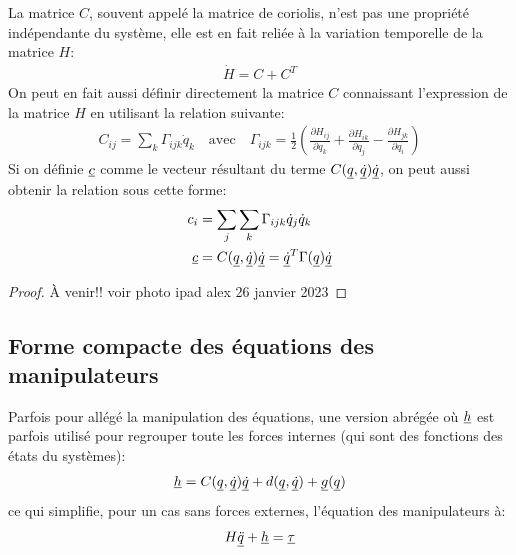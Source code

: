 La matrice $C$, souvent appelé la matrice de coriolis, n'est pas une propriété indépendante du système, elle est en fait reliée à la variation temporelle de la matrice $H$:
\begin{align}
\dot{H} = C + C^T
\label{eq:cener}
\end{align}
On peut en fait aussi définir directement la matrice $C$ connaissant l'expression de la matrice $H$ en utilisant la relation suivante:
\begin{align}
C_{ij} = \sum_k \Gamma_{ijk} \dot{q}_k \quad \text{avec} \quad \Gamma_{ijk} = \frac{1}{2}\left(  \frac{\partial H_{ij}}{\partial q_k} + \frac{\partial H_{ik}}{\partial q_j} - \frac{\partial H_{jk}}{\partial q_i}   \right)
\end{align}
Si on définie $\underline{c}$ comme le vecteur résultant du terme $C(\underline{q},\underline{\dot{q}})\underline{\dot{q}}$, on peut aussi obtenir la relation sous cette forme:
\begin{align}
c_i &= \sum_j \sum_k \Gamma_{ijk} \dot{q}_j \dot{q}_k \\ 
\underline{c} &= C(\underline{q},\underline{\dot{q}})\underline{\dot{q}} = \underline{\dot{q}}^T \Gamma(\underline{q}) \underline{\dot{q}}
\end{align}

\begin{proof}
À venir!! voir photo ipad alex 26 janvier 2023
\end{proof}

%


\newpage
\subsection{Forme compacte des équations des manipulateurs}

Parfois pour allégé la manipulation des équations, une version abrégée où $\underline{h}$ est parfois utilisé pour regrouper toute les forces internes (qui sont des fonctions des états du systèmes):
\begin{align}
\underline{h} = C(\underline{q},\underline{\dot{q}}) \underline{\dot{q}} + d(\underline{q}, \underline{\dot{q}}) + \underline{g}(\underline{q})
\end{align}
ce qui simplifie, pour un cas sans forces externes, l'équation des manipulateurs à:
\begin{align}
H \underline{\ddot{q}} + \underline{h} = \underline{\tau} 
\label{eq:manipulator_short}
\end{align}


